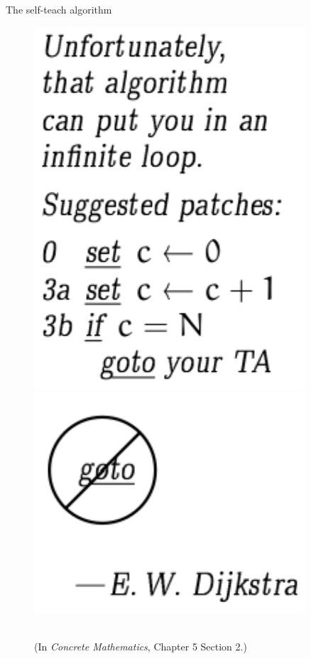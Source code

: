 \documentclass[handout]{beamer}
\begin{document}
\begin{frame}{The self-teach algorithm}
\begin{figure}[htbp]
\begin{minipage}{0.3\textwidth}
            \includegraphics[width=0.9\textwidth]{figures/self-teach2.png}
        \end{minipage}
        \begin{minipage}{0.3\textwidth}
            \centering
            \includegraphics[width=0.9\textwidth]{figures/nogoto.png}
        \end{minipage}\\
        (In \textit{Concrete Mathematics}, Chapter 5 Section 2.)
    \end{figure}
\end{frame}
\end{document}
